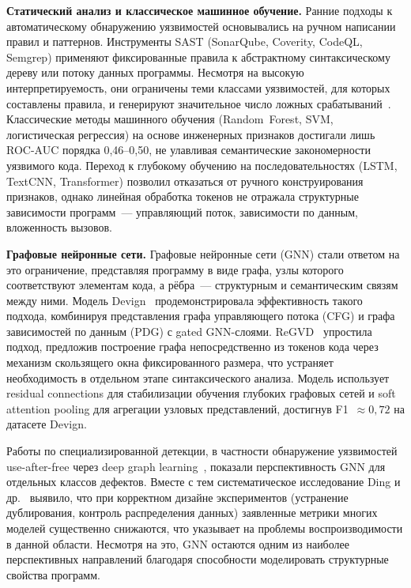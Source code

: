 \documentclass[runningheads]{llncs}
\begin{document}
\textbf{Статический анализ и классическое машинное обучение.}
Ранние подходы к автоматическому обнаружению уязвимостей основывались на ручном написании правил и паттернов. Инструменты SAST (SonarQube, Coverity, CodeQL, Semgrep) применяют фиксированные правила к абстрактному синтаксическому дереву или потоку данных программы. Несмотря на высокую интерпретируемость, они ограничены теми классами уязвимостей, для которых составлены правила, и генерируют значительное число ложных срабатываний~\cite{sultana2024}. Классические методы машинного обучения (Random~Forest, SVM, логистическая регрессия) на основе инженерных признаков достигали лишь ROC-AUC порядка 0,46--0,50, не улавливая семантические закономерности уязвимого кода. Переход к глубокому обучению на последовательностях (LSTM, TextCNN, Transformer) позволил отказаться от ручного конструирования признаков, однако линейная обработка токенов не отражала структурные зависимости программ~--- управляющий поток, зависимости по данным, вложенность вызовов.

\textbf{Графовые нейронные сети.}
Графовые нейронные сети (GNN) стали ответом на это ограничение, представляя программу в виде графа, узлы которого соответствуют элементам кода, а рёбра~--- структурным и семантическим связям между ними. Модель Devign~\cite{zhou2019devign} продемонстрировала эффективность такого подхода, комбинируя представления графа управляющего потока (CFG) и графа зависимостей по данным (PDG) с gated GNN-слоями. ReGVD~\cite{nguyen2022regvd} упростила подход, предложив построение графа непосредственно из токенов кода через механизм скользящего окна фиксированного размера, что устраняет необходимость в отдельном этапе синтаксического анализа. Модель использует residual connections для стабилизации обучения глубоких графовых сетей и soft attention pooling для агрегации узловых представлений, достигнув F1~$\approx 0{,}72$ на датасете Devign.

Работы по специализированной детекции, в частности обнаружение уязвимостей use-after-free через deep graph learning~\cite{chen2024uaf}, показали перспективность GNN для отдельных классов дефектов. Вместе с тем систематическое исследование Ding и др.~\cite{ding2024} выявило, что при корректном дизайне экспериментов (устранение дублирования, контроль распределения данных) заявленные метрики многих моделей существенно снижаются, что указывает на проблемы воспроизводимости в данной области. Несмотря на это, GNN остаются одним из наиболее перспективных направлений благодаря способности моделировать структурные свойства программ.
\end{document}

